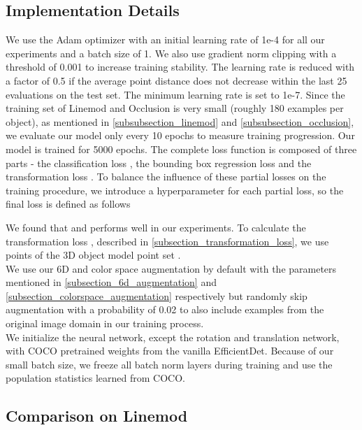 \documentclass[twocolumn, 10pt, letterpaper]{article}
\begin{document}
\subsection{Implementation Details}
\label{subsection_implementation_details}
We use the Adam optimizer\cite{Adam} with an initial learning rate of 1e-4 for all our experiments and a batch size of 1. We also use gradient norm clipping with a threshold of 0.001 to increase training stability. The learning rate is reduced with a factor of 0.5 if the average point distance does not decrease within the last 25 evaluations on the test set. The minimum learning rate is set to 1e-7. Since the training set of Linemod and Occlusion is very small (roughly 180 examples per object), as mentioned in \autoref{subsubsection_linemod} and \autoref{subsubsection_occlusion}, we evaluate our model only every 10 epochs to measure training progression. Our model is trained for 5000 epochs. The complete loss function  is composed of three parts - the classification loss , the bounding box regression loss  and the transformation loss . To balance the influence of these partial losses on the training procedure, we introduce a hyperparameter  for each partial loss, so the final loss  is defined as follows

We found that  and  performs well in our experiments. To calculate the transformation loss , described in \autoref{subsection_transformation_loss}, we use  points of the 3D object model point set .\\
We use our 6D and color space augmentation by default with the parameters mentioned in \autoref{subsection_6d_augmentation} and \autoref{subsection_colorspace_augmentation} respectively but randomly skip augmentation with a probability of 0.02 to also include examples from the original image domain in our training process.\\
We initialize the neural network, except the rotation and translation network, with COCO\cite{COCO} pretrained weights from the vanilla EfficientDet\cite{EfficientDet}. Because of our small batch size, we freeze all batch norm layers during training and use the population statistics learned from COCO.

\subsection{Comparison on Linemod}
\label{subsection_comparison_linemod}
\end{document}
